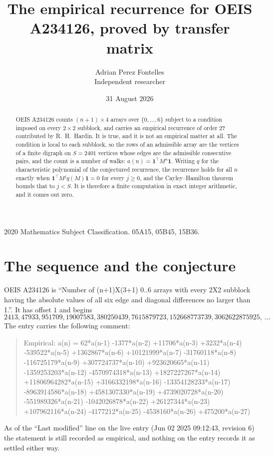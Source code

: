 \documentclass[11pt,a4paper]{article}
\title{The empirical recurrence for OEIS A234126, proved by transfer matrix}
\author{Adrian Perez Fontelles\\ \small Independent researcher}
\date{31 August 2026}
\theoremstyle{plain}
\theoremstyle{definition}
\begin{document}
\maketitle

\begin{abstract}
OEIS A234126 counts $(n+1)\times4$ arrays over $\{0,\dots,6\}$ subject to a condition imposed on
every $2\times2$ subblock, and carries an empirical recurrence of order $27$ contributed
by R.~H.~Hardin. It is true, and it is not an empirical matter at all. The condition is local
to each subblock, so the rows of an admissible array are the vertices of a finite digraph
on $S=2401$ vertices whose edges are the admissible consecutive pairs, and the count is a
number of walks: $a(n)=\mathbf{1}^{\!\top}M^{n}\mathbf{1}$. Writing $q$
for the characteristic polynomial of the conjectured recurrence, the recurrence holds for all
$n$ exactly when $\mathbf{1}^{\!\top}M^{j}q(M)\mathbf{1}=0$ for every $j\ge0$, and the
Cayley--Hamilton theorem bounds that to $j<S$. It is therefore a finite computation in exact
integer arithmetic, and it comes out zero.
\end{abstract}

\noindent\small 2020 Mathematics Subject Classification. 05A15, 05B45, 15B36.\normalsize

\section{The sequence and the conjecture}

OEIS A234126 is ``Number of (n+1)X(3+1) 0..6 arrays with every 2X2 subblock having the absolute values of all six edge and diagonal differences no larger than 1.''. It has offset $1$ and begins
\[
2413, 47933, 951709, 19007583, 380250439, 7615879723, 152668773739, 3062622875925,\ \dots
\]
The entry carries the following comment:
\begin{quote}\small
Empirical: a(n) = 62*a(n-1) -1377*a(n-2) +11706*a(n-3) +3232*a(n-4) -539522*a(n-5) +1362867*a(n-6) +10121999*a(n-7) -31760118*a(n-8) -116725179*a(n-9) +307724737*a(n-10) +923620665*a(n-11) -1359253203*a(n-12) -4570974318*a(n-13) +1827227267*a(n-14) +11806964282*a(n-15) +3166332198*a(n-16) -13354128233*a(n-17) -8963914586*a(n-18) +4581307330*a(n-19) +4739020728*a(n-20) -551989326*a(n-21) -1042026878*a(n-22) +26127344*a(n-23) +107962116*a(n-24) -4177212*a(n-25) -4538160*a(n-26) +475200*a(n-27)
\end{quote}
As of the ``Last modified'' line on the live entry (Jun 02 2025 09:12:43, revision 6) the statement is
still recorded as empirical, and nothing on the entry records it as settled either way.
\end{document}
